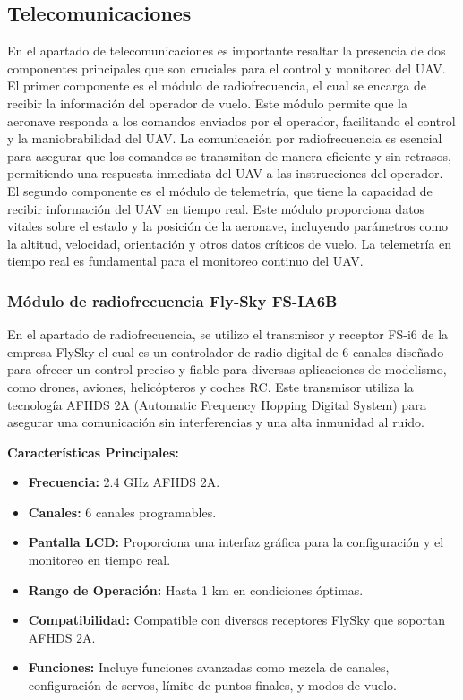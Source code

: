 \subsection{Telecomunicaciones}

En el apartado de telecomunicaciones es importante resaltar la presencia de dos componentes principales que son cruciales para el control y monitoreo del UAV. \\ 

El primer componente es el módulo de radiofrecuencia, el cual se encarga de recibir la información del operador de vuelo. Este módulo permite que la aeronave responda a los comandos enviados por el operador, facilitando el control y la maniobrabilidad del UAV. La comunicación por radiofrecuencia es esencial para asegurar que los comandos se transmitan de manera eficiente y sin retrasos, permitiendo una respuesta inmediata del UAV a las instrucciones del operador.\\ 

El segundo componente es el módulo de telemetría, que tiene la capacidad de recibir información del UAV en tiempo real. Este módulo proporciona datos vitales sobre el estado y la posición de la aeronave, incluyendo parámetros como la altitud, velocidad, orientación y otros datos críticos de vuelo. La telemetría en tiempo real es fundamental para el monitoreo continuo del UAV.\\ 
\subsubsection{Módulo de radiofrecuencia Fly-Sky FS-IA6B}

En el apartado de radiofrecuencia, se utilizo el transmisor y receptor FS-i6 de la empresa FlySky el cual es un controlador de radio digital de 6 canales diseñado para ofrecer un control preciso y fiable para diversas aplicaciones de modelismo, como drones, aviones, helicópteros y coches RC. Este transmisor utiliza la tecnología AFHDS 2A (Automatic Frequency Hopping Digital System) para asegurar una comunicación sin interferencias y una alta inmunidad al ruido. \cite{flysky}

\textbf{Características Principales:}
\begin{itemize}
    \item \textbf{Frecuencia:} 2.4 GHz AFHDS 2A.
    \item \textbf{Canales:} 6 canales programables.
    \item \textbf{Pantalla LCD:} Proporciona una interfaz gráfica para la configuración y el monitoreo en tiempo real.\cite{19}
    \item \textbf{Rango de Operación:} Hasta 1 km en condiciones óptimas.\cite{19}
    \item \textbf{Compatibilidad:} Compatible con diversos receptores FlySky que soportan AFHDS 2A.\cite{flysky}
    \item \textbf{Funciones:} Incluye funciones avanzadas como mezcla de canales, configuración de servos, límite de puntos finales, y modos de vuelo.   \cite{flysky}
\end{itemize}

